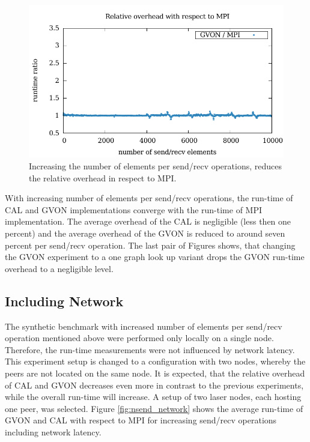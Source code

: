 \begin{figure}[H]
\begin{minipage}[t]{0.5\textwidth}
    \includegraphics[width=\textwidth]{plots/50_nsize_one_lookup_overhead_gvon_laser}
  \end{minipage}%
  \caption{Increasing the number of elements per send/recv operations,
    reduces the relative overhead in respect to MPI.}
  \label{fig:nsize_kepler}
\end{figure}

\noindent With increasing number of elements per send/recv operations,
the run-time of CAL and GVON implementations converge with the
run-time of MPI implementation. The average overhead of the CAL is
negligible (less then one percent) and the average overhead of the
GVON is reduced to around seven percent per send/recv operation. The
last pair of Figures shows, that changing the GVON experiment to a one
graph look up variant drops the GVON run-time overhead to a negligible
level.

\subsection*{Including Network}
The synthetic benchmark with increased number of elements per
send/recv operation mentioned above were performed only locally on a
single node.  Therefore, the run-time measurements were not influenced
by network latency.  This experiment setup is changed to a
configuration with two nodes, whereby the peers are not located on the
same node. It is expected, that the relative overhead of CAL and GVON
decreases even more in contrast to the previous experiments, while the
overall run-time will increase.  A setup of two laser nodes, each
hosting one peer, was selected.  Figure \ref{fig:nsend_network} shows
the average run-time of GVON and CAL with respect to MPI for
increasing send/recv operations including network latency.

